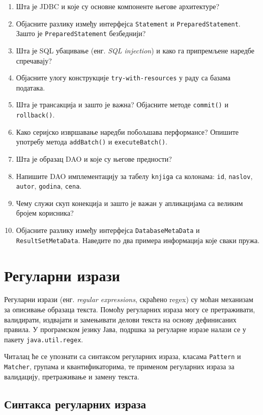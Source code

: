 \begin{enumerate}
\item Шта је JDBC и које су основне компоненте његове архитектуре?
\item Објасните разлику између интерфејса \texttt{Statement} и \texttt{PreparedStatement}. Зашто је \texttt{PreparedStatement} безбеднији?
\item Шта је SQL убацивање (енг. \textit{SQL injection}) и како га припремљене наредбе спречавају?
\item Објасните улогу конструкције \texttt{try-with-resources} у раду са базама података.
\item Шта је трансакција и зашто је важна? Објасните методе \texttt{commit()} и \texttt{rollback()}.
\item Како серијско извршавање наредби побољшава перформансе? Опишите употребу метода \texttt{addBatch()} и \texttt{executeBatch()}.
\item Шта је образац DAO и које су његове предности?
\item Напишите DAO имплементацију за табелу \texttt{knjiga} са колонама: \texttt{id}, \texttt{naslov}, \texttt{autor}, \texttt{godina}, \texttt{cena}.
\item Чему служи скуп конекција и зашто је важан у апликацијама са великим бројем корисника?
\item Објасните разлику између интерфејса \texttt{DatabaseMetaData} и \texttt{ResultSetMetaData}. Наведите по два примера информација које сваки пружа.
\end{enumerate}


\setlength{\parindent}{15pt}
\setlength{\parskip}{0pt}
\chapter{Регуларни изрази}

Регуларни изрази (енг. \textit{regular expressions}, скраћено regex) су моћан механизам за описивање образаца текста. Помоћу регуларних израза могу се претраживати, валидирати, издвајати и замењивати делови текста на основу дефинисаних правила. У програмском језику Јава, подршка за регуларне изразе налази се у пакету \texttt{java.util.regex}.

Читалац ће се упознати са синтаксом регуларних израза, класама \texttt{Pattern} и \texttt{Matcher}, групама и квантификаторима, те применом регуларних израза за валидацију, претраживање и замену текста.


\section{Синтакса регуларних израза}

